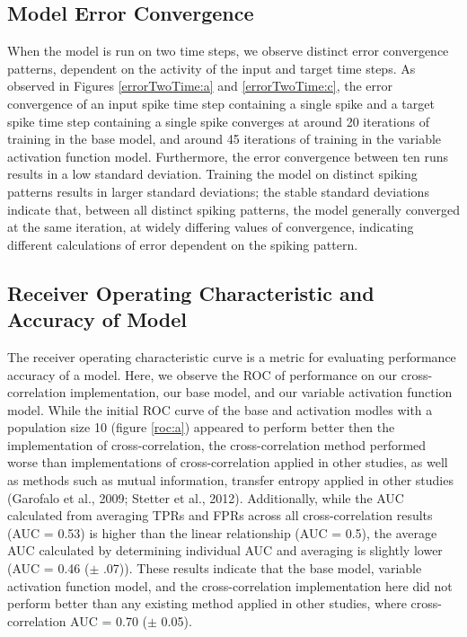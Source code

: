 \documentclass[11pt,titlepage]{article}
\begin{document}
\subsection{Model Error Convergence}
When the model is run on two time steps, we observe distinct error convergence patterns, dependent on the activity of the input and target time steps. As observed in Figures \ref{errorTwoTime:a} and \ref{errorTwoTime:c}, the error convergence of an input spike time step containing a single spike and a target spike time step containing a single spike converges at around 20 iterations of training in the base model, and around 45 iterations of training in the variable activation function model. Furthermore, the error convergence between ten runs results in a low standard deviation. Training the model on distinct spiking patterns results in larger standard deviations; the stable standard deviations indicate that, between all distinct spiking patterns, the model generally converged at the same iteration, at widely differing values of convergence, indicating different calculations of error dependent on the spiking pattern.

\subsection{Receiver Operating Characteristic and Accuracy of Model}
The receiver operating characteristic curve is a metric for evaluating performance accuracy of a model. Here, we observe the ROC of performance on our cross-correlation implementation, our base model, and our variable activation function model. While the initial ROC curve of the base and activation modles with a population size 10 (figure \ref{roc:a}) appeared to perform better then the implementation of cross-correlation, the cross-correlation method performed worse than implementations of cross-correlation applied in other studies, as well as methods such as mutual information, transfer entropy applied in other studies (Garofalo et al., 2009; Stetter et al., 2012). Additionally, while the AUC calculated from averaging TPRs and FPRs across all cross-correlation results (AUC = 0.53) is higher than the linear relationship (AUC = 0.5), the average AUC calculated by determining individual AUC and averaging is slightly lower (AUC = 0.46 ($\pm$ .07)). These results indicate that the base model, variable activation function model, and the cross-correlation implementation here did not perform better than any existing method applied in other studies, where cross-correlation AUC = 0.70 ($\pm$ 0.05).
\end{document}
